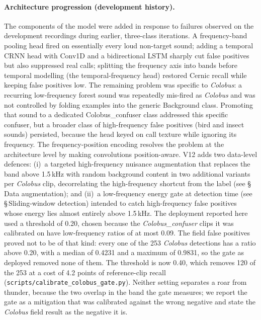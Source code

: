 \documentclass[review,3p,times]{elsarticle}
\begin{document}
\paragraph{Architecture progression (development history).}
The components of the model were added in response to failures observed on the
development recordings during earlier, three-class iterations. A
frequency-band pooling head fired on essentially every loud non-target
sound; adding a temporal CRNN head with Conv1D and a bidirectional LSTM
sharply cut false positives but also suppressed real calls; splitting the
frequency axis into bands before temporal modelling (the temporal-frequency
head) restored Cernic recall while keeping false positives low. The
remaining problem was specific to \textit{Colobus}: a recurring low-frequency
forest sound was repeatedly mis-fired as \textit{Colobus} and was not
controlled by folding examples into the generic Background class. Promoting that
sound to a dedicated Colobus\_confuser class addressed this
specific confuser, but a broader class of high-frequency false positives
(bird and insect sounds) persisted, because the head keyed on call texture
while ignoring its frequency. The frequency-position encoding resolves
the problem at the architecture level by making convolutions position-aware.
V12 adds two data-level defences: (i)~a targeted high-frequency nuisance
augmentation that replaces the band above 1.5\,kHz with random background
content in two additional variants per \textit{Colobus} clip, decorrelating the
high-frequency shortcut from the label (see \S\,Data augmentation); and (ii)~a
low-frequency energy gate at detection time (see \S\,Sliding-window detection)
intended to catch high-frequency false positives whose energy lies almost
entirely above 1.5\,kHz. The deployment reported here used a threshold of
0.20, chosen because the \textit{Colobus\_confuser} clips it was calibrated on
have low-frequency ratios of at most 0.09. The field false positives proved not
to be of that kind: every one of the 253 \textit{Colobus} detections has a
ratio above 0.20, with a median of 0.4231 and a maximum of 0.9831, so the gate
as deployed removed none of them. The threshold is now 0.40, which removes 120
of the 253 at a cost of 4.2 points of reference-clip recall
(\texttt{scripts/calibrate\_colobus\_gate.py}). Neither setting separates a
roar from thunder, because the two overlap in the band the gate measures; we
report the gate as a mitigation that was calibrated against the wrong negative
and state the \textit{Colobus} field result as the negative it is.
\end{document}
